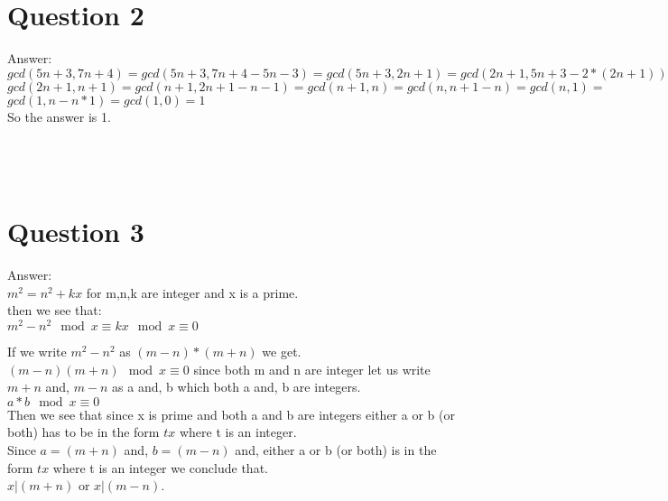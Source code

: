 \documentclass[12pt]{article}
\begin{document}
\section*{Question 2}

Answer:\\

    $gcd(5n+3,7n+4) = gcd(5n+3,7n+4-5n-3) = gcd(5n+3,2n+1) = gcd(2n+1,5n+3-2*(2n+1)) =$\\
    
    $gcd(2n+1,n+1) = gcd(n+1,2n+1-n-1) = gcd(n+1,n) = gcd(n,n+1-n) = gcd(n,1) =$\\
    
    $gcd(1,n-n*1) = gcd(1,0) = 1$\\
    
    So the answer is 1.\\\\\\\\

\section*{Question 3}

Answer:\\

    $m^2 = n^2 + kx$ for m,n,k are integer and x is a prime.\\
    
    then  we see that:\\
    
    $ m^2-n^2 \mod x \equiv kx \mod x \equiv 0$
    
    If we write $m^2-n^2$ as $(m-n)*(m+n)$ we get.\\
    
    $(m-n)(m+n) \mod x \equiv 0$ since both m and n are integer let us write $m+n$ and, $m-n$ as a and, b which both a and, b are integers.\\
    
    $a*b \mod x \equiv 0$\\
    
    Then we see that since x is prime and both a and b are integers either a or b (or both) has to be in the form $tx$ where t is an integer.\\
    
    Since $a = (m+n)$ and, $b = (m-n)$ and, either a or b (or both) is in the form $tx$ where t is an integer we conclude that.\\
    
    $x|(m+n)$ or $x|(m-n)$.\\
\end{document}
